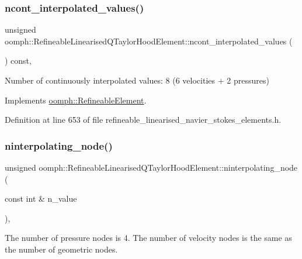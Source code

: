 \subsubsection{\texorpdfstring{ncont\+\_\+interpolated\+\_\+values()}{ncont\_interpolated\_values()}}
{\footnotesize\ttfamily unsigned oomph\+::\+Refineable\+Linearised\+Q\+Taylor\+Hood\+Element\+::ncont\+\_\+interpolated\+\_\+values (\begin{DoxyParamCaption}{ }\end{DoxyParamCaption}) const\hspace{0.3cm}{\ttfamily [inline]}, {\ttfamily [virtual]}}



Number of continuously interpolated values\+: 8 (6 velocities + 2 pressures) 



Implements \hyperlink{classoomph_1_1RefineableElement_a53e171a18c9f43f1db90a6876516a073}{oomph\+::\+Refineable\+Element}.



Definition at line 653 of file refineable\+\_\+linearised\+\_\+navier\+\_\+stokes\+\_\+elements.\+h.

\mbox{\label{classoomph_1_1RefineableLinearisedQTaylorHoodElement_af3ac207744e86fefd03948c30f3bdb33}} 
\subsubsection{\texorpdfstring{ninterpolating\+\_\+node()}{ninterpolating\_node()}}
{\footnotesize\ttfamily unsigned oomph\+::\+Refineable\+Linearised\+Q\+Taylor\+Hood\+Element\+::ninterpolating\+\_\+node (\begin{DoxyParamCaption}\item[{const int \&}]{n\+\_\+value }\end{DoxyParamCaption})\hspace{0.3cm}{\ttfamily [inline]}, {\ttfamily [virtual]}}



The number of pressure nodes is 4. The number of velocity nodes is the same as the number of geometric nodes. 




